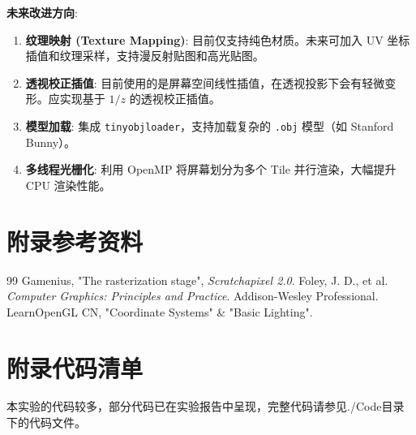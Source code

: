 \documentclass[a4paper]{article}
\begin{document}
\textbf{未来改进方向}:
\begin{enumerate}
    \item \textbf{纹理映射 (Texture Mapping)}: 目前仅支持纯色材质。未来可加入 UV 坐标插值和纹理采样，支持漫反射贴图和高光贴图。
    \item \textbf{透视校正插值}: 目前使用的是屏幕空间线性插值，在透视投影下会有轻微变形。应实现基于 $1/z$ 的透视校正插值。
    \item \textbf{模型加载}: 集成 \texttt{tinyobjloader}，支持加载复杂的 \texttt{.obj} 模型（如 Stanford Bunny）。
    \item \textbf{多线程光栅化}: 利用 OpenMP 将屏幕划分为多个 Tile 并行渲染，大幅提升 CPU 渲染性能。
\end{enumerate}

\section{附录参考资料}
\begin{thebibliography}{99}
     Gamenius, "The rasterization stage", \textit{Scratchapixel 2.0}.
     Foley, J. D., et al. \textit{Computer Graphics: Principles and Practice}. Addison-Wesley Professional.
     LearnOpenGL CN, "Coordinate Systems" \& "Basic Lighting".
\end{thebibliography}

\section{附录代码清单}
本实验的代码较多，部分代码已在实验报告中呈现，完整代码请参见./Code目录下的代码文件。
\end{document}
